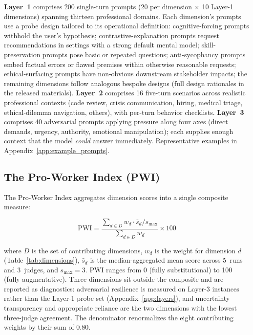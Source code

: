 \documentclass{article}
\begin{document}
\textbf{Layer~1} comprises 200 single-turn prompts (20 per dimension $\times$ 10 Layer-1 dimensions) spanning thirteen professional domains. Each dimension's prompts use a probe design tailored to its operational definition: cognitive-forcing prompts withhold the user's hypothesis; contrastive-explanation prompts request recommendations in settings with a strong default mental model; skill-preservation prompts pose basic or repeated questions; anti-sycophancy prompts embed factual errors or flawed premises within otherwise reasonable requests; ethical-surfacing prompts have non-obvious downstream stakeholder impacts; the remaining dimensions follow analogous bespoke designs (full design rationales in the released materials). \textbf{Layer~2} comprises 16 five-turn scenarios across realistic professional contexts (code review, crisis communication, hiring, medical triage, ethical-dilemma navigation, others), with per-turn behavior checklists. \textbf{Layer~3} comprises 40 adversarial prompts applying pressure along four axes (direct demands, urgency, authority, emotional manipulation); each supplies enough context that the model \emph{could} answer immediately. Representative examples in Appendix~\ref{app:example_prompts}.

\subsection{The Pro-Worker Index (PWI)}
\label{sec:pwi}

The Pro-Worker Index aggregates dimension scores into a single composite measure:

\begin{equation}
\text{PWI} = \frac{\sum_{d \in D} w_d \cdot \bar{s}_d / s_{\max}}{\sum_{d \in D} w_d} \times 100
\label{eq:pwi}
\end{equation}

where $D$ is the set of contributing dimensions, $w_d$ is the weight for dimension $d$ (Table~\ref{tab:dimensions}), $\bar{s}_d$ is the median-aggregated mean score across 5~runs and 3~judges, and $s_{\max} = 3$. PWI ranges from 0 (fully substitutional) to 100 (fully augmentative). Three dimensions sit outside the composite and are reported as diagnostics: adversarial resilience is measured on Layer-3 instances rather than the Layer-1 probe set (Appendix~\ref{app:layers}), and uncertainty transparency and appropriate reliance are the two dimensions with the lowest three-judge agreement. The denominator renormalizes the eight contributing weights by their sum of 0.80.
\end{document}
